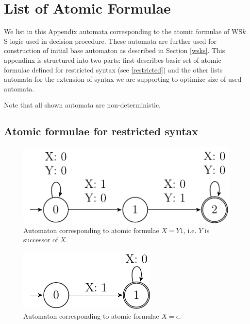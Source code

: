 \chapter{List of Atomic Formulae}

We list in this Appendix automata corresponding to the atomic formulae of WS$k$S
logic used in decision procedure. These automata are further used for
construction of initial base automaton as described in Section \ref{wsks}. This
appendinx is structured into two parts: first describes basic set of atomic
formulae defined for restricted syntax (see \ref{restricted}) and the other
lists automata for the extension of syntax we are supporting to optimize size of
used automata.

Note that all shown automata are non-deterministic.

\section{Atomic formulae for restricted syntax}

\begin{figure}[h!]
 \begin{center}
  \includegraphics{fig/atomic-equal-succ}
 \end{center}
 \caption{Automaton corresponding to atomic formulae $X = Y1$, i.e. $Y$ is
 successor of $X$.}
\end{figure}

\begin{figure}[h!]
 \begin{center}
  \includegraphics{fig/atomic-equals-zero}
 \end{center}
 \caption{Automaton corresponding to atomic formulae $X = \epsilon$.}
\end{figure}

